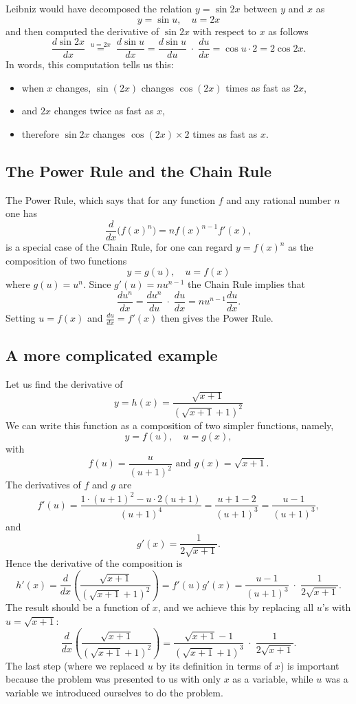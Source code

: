 Leibniz would have decomposed the relation $y=\sin 2x$ between $y$ and $x$ as
\[
y=\sin u,\quad u= 2x
\]
and then computed the derivative of $\sin 2x$ with respect to $x$ as follows
\[
\frac{d \sin 2x}{dx} \; \stackrel{u=2x}{=} \; \frac{d\sin u}{dx}
=\frac{d\sin u}{du} \;\cdot\;\frac{du}{dx}
=\cos u \cdot 2
=2\cos 2x.
\]
In words, this computation tells us this:  
\begin{itemize}
\item when $x$ changes, $\sin(2x)$ changes $\cos(2x)$ times as fast as $2x$,
\item and $2x$ changes twice as fast as $x$,
\item therefore $\sin 2x$ changes $\cos(2x) \times 2$ times as fast as
  $x$.
\end{itemize}








\subsection{The Power Rule and the Chain Rule} 
The Power Rule, which says that for any function $f$ and any rational
number $n$ one has
\[
\frac{d}{dx}\bigl(f(x)^n\bigr) = nf(x)^{n-1}f'(x),
\]
is a special case of the Chain Rule, for one can regard $y=f(x)^n$ as
the composition of two functions
\[
y=g(u), \quad u=f(x)
\]
where $g(u) = u^n$.  Since $g'(u) = nu^{n-1}$ the Chain Rule implies
that
\[
\frac{du^n}{dx} = \frac{du^n}{du}\;\cdot\;\frac{du}{dx}= nu^{n-1}\frac{du}{dx}.
\]
Setting $u=f(x)$ and $\frac{du}{dx} = f'(x)$ then gives the Power
Rule.




\subsection{A more complicated example} 
Let us find the derivative of
\[
y = h(x) = \frac{\sqrt{x+1}}{(\sqrt{x+1}+ 1)^2}
\]
We can write this function as a composition of two simpler functions, namely,
\[
y=f(u), \quad u=g(x),
\]
with
\[
f(u) = \frac{u}{(u+1)^{2}}
\text{ and }
g(x) = \sqrt{x+1}.
\]
The derivatives of $f$ and $g$ are
\[
f'(u) = \frac{1\cdot(u+1)^2 - u\cdot 2(u+1)}{(u+1)^4}
=\frac{u+1-2}{(u+1)^3} = \frac{u-1}{(u+1)^{3}},
\]
and
\[
g'(x) = \frac1{2\sqrt{x+1}}.
\]
Hence the derivative of the composition is
\[
h'(x) = \frac{d}{dx}\left(\frac{\sqrt{x+1}}{(\sqrt{x+1}+ 1)^2}\right)
=f'(u) g'(x)
=\frac{u-1}{(u+1)^{3}}\;\cdot\;\frac1{2\sqrt{x+1}}.
\]
The result should be a function of $x$, and we achieve this by
replacing all $u$'s with $u=\sqrt{x+1}$:
\[
\frac{d}{dx}\left(\frac{\sqrt{x+1}}{(\sqrt{x+1}+ 1)^2}\right)
=
\frac{\sqrt{x+1}-1}{(\sqrt{x+1}+1)^{3}}\;\cdot\;\frac1{2\sqrt{x+1}}.
\]
The last step (where we replaced $u$ by its definition in terms of
$x$) is important because the problem was presented to us with only
$x$ as a variable, while $u$ was a variable we introduced
ourselves to do the problem.





